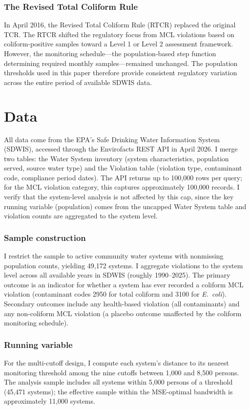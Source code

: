 \documentclass[12pt]{article}
\begin{document}
\subsubsection*{The Revised Total Coliform Rule} In April 2016, the Revised Total Coliform Rule (RTCR) replaced the original TCR. The RTCR shifted the regulatory focus from MCL violations based on coliform-positive samples toward a Level 1 or Level 2 assessment framework. However, the monitoring schedule---the population-based step function determining required monthly samples---remained unchanged. The population thresholds used in this paper therefore provide consistent regulatory variation across the entire period of available SDWIS data.


\section{Data}
\label{sec:data}

All data come from the EPA's Safe Drinking Water Information System (SDWIS), accessed through the Envirofacts REST API in April 2026. I merge two tables: the Water System inventory (system characteristics, population served, source water type) and the Violation table (violation type, contaminant code, compliance period dates). The API returns up to 100,000 rows per query; for the MCL violation category, this captures approximately 100,000 records. I verify that the system-level analysis is not affected by this cap, since the key running variable (population) comes from the uncapped Water System table and violation counts are aggregated to the system level.

\subsubsection*{Sample construction} I restrict the sample to active community water systems with nonmissing population counts, yielding 49,172 systems. I aggregate violations to the system level across all available years in SDWIS (roughly 1990--2025). The primary outcome is an indicator for whether a system has ever recorded a coliform MCL violation (contaminant codes 2950 for total coliform and 3100 for \textit{E.~coli}). Secondary outcomes include any health-based violation (all contaminants) and any non-coliform MCL violation (a placebo outcome unaffected by the coliform monitoring schedule).

\subsubsection*{Running variable} For the multi-cutoff design, I compute each system's distance to its nearest monitoring threshold among the nine cutoffs between 1,000 and 8,500 persons. The analysis sample includes all systems within 5,000 persons of a threshold (45,471 systems); the effective sample within the MSE-optimal bandwidth is approximately 11,000 systems.
\end{document}
